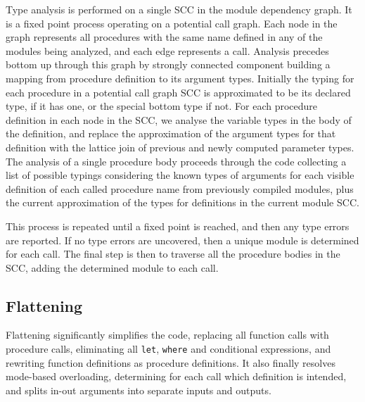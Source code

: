 \documentclass{article}
\begin{document}
Type analysis is performed on a single SCC in the module dependency graph.
It is a fixed point process operating on a potential call graph.
Each node in the graph represents all procedures with the same name defined
in any of the modules being analyzed, and each edge represents a call.
Analysis precedes bottom up through this graph by strongly connected component
building a mapping from procedure definition to its argument types.
Initially the typing for each procedure in a potential call graph SCC
is approximated to be its declared type,
if it has one, or the special bottom type if not.
For each procedure definition in each node in the SCC,
we analyse the variable types in the body of the definition,
and replace the approximation of the argument types for that definition
with the lattice join of previous and newly computed parameter types.
The analysis of a single procedure body proceeds through the code collecting
a list of possible typings considering the known types of arguments for each
visible definition of each called procedure name from previously compiled
modules, plus the current approximation of the types for definitions in the
current module SCC.

This process is repeated until a fixed point is reached, and then
any type errors are reported.
If no type errors are uncovered, then a unique module is determined for
each call.
The final step is then to traverse all the procedure
bodies in the SCC, adding the determined module to each call.


\subsection{Flattening}
\label{sec:flattening}

Flattening significantly simplifies the code,
replacing all function calls with procedure calls,
eliminating all \texttt{let}, \texttt{where} and conditional
expressions, and rewriting function definitions as procedure definitions.
It also finally resolves mode-based overloading, determining for
each call which definition is intended, and splits in-out arguments
into separate inputs and outputs.
\end{document}
